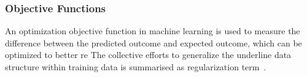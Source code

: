 \subsubsection{Objective Functions}
An optimization objective function in machine learning is used to measure the difference between the predicted outcome and expected outcome, which can be optimized to better re The collective efforts to generalize the underline data structure within training data is summarised as regularization term~\cite{goodfellow_2015}.  